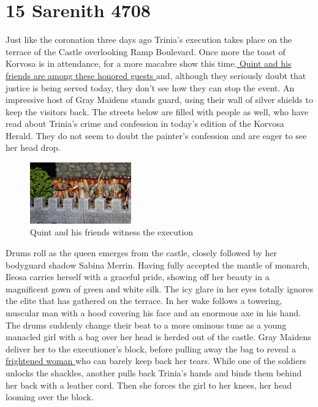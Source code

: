 \section{15 Sarenith 4708}

Just like the coronation three days ago Trinia's execution takes place on the terrace of the Castle overlooking Ramp Boulevard. Once more the toast of Korvosa is in attendance, for a more macabre show this time.\hyperref[fig:Quint-and-his-friends-witness-the-execution-470603218]{ Quint and his friends are among these honored guests } and, although they seriously doubt that justice is being served today, they don't see how they can stop the event. An impressive host of Gray Maidens stands guard, using their wall of silver shields to keep the visitors back. The streets below are filled with people as well, who have read about Trinia's crime and confession in today's edition of the Korvosa Herald. They do not seem to doubt the painter's confession and are eager to see her head drop. \\

\begin{figure}[h]
	\centering
	\includegraphics[width=0.39\textwidth]{images/Quint-and-his-friends-witness-the-execution-470603218.jpg}
	\caption{Quint and his friends witness the execution}
	\label{fig:Quint-and-his-friends-witness-the-execution-470603218}
\end{figure}

Drums roll as the queen emerges from the castle, closely followed by her bodyguard shadow Sabina Merrin. Having fully accepted the mantle of monarch, Ileosa carries herself with a graceful pride, showing off her beauty in a magnificent gown of green and white silk. The icy glare in her eyes totally ignores the elite that has gathered on the terrace. In her wake follows a towering, muscular man with a hood covering his face and an enormous axe in his hand. The drums suddenly change their beat to a more ominous tune as a young manacled girl with a bag over her head is herded out of the castle. Gray Maidens deliver her to the executioner's block, before pulling away the bag to reveal a\hyperref[fig:Trinia-Sabor-facing-the-executioner-470603042]{ frightened woman } who can barely keep back her tears. While one of the soldiers unlocks the shackles, another pulls back Trinia's hands and binds them behind her back with a leather cord. Then she forces the girl to her knees, her head looming over the block. \\

